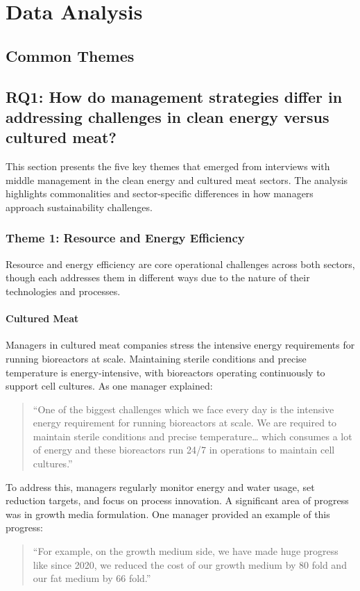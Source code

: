 
\section{Data Analysis}

\subsection*{Common Themes}

\subsection*{RQ1: How do management strategies differ in addressing challenges in clean energy versus cultured meat?}
This section presents the five key themes that emerged from interviews with middle management in the clean energy and cultured meat sectors. The analysis highlights commonalities and sector-specific differences in how managers approach sustainability challenges.

\subsubsection*{Theme 1: Resource and Energy Efficiency}
Resource and energy efficiency are core operational challenges across both sectors, though each addresses them in different ways due to the nature of their technologies and processes.

\paragraph{Cultured Meat}
Managers in cultured meat companies stress the intensive energy requirements for running bioreactors at scale. Maintaining sterile conditions and precise temperature is energy-intensive, with bioreactors operating continuously to support cell cultures. As one manager explained:
\begin{quote}
	“One of the biggest challenges which we face every day is the intensive energy requirement for running bioreactors at scale. We are required to maintain sterile conditions and precise temperature… which consumes a lot of energy and these bioreactors run 24/7 in operations to maintain cell cultures.”
\end{quote}
To address this, managers regularly monitor energy and water usage, set reduction targets, and focus on process innovation. A significant area of progress was in growth media formulation. One manager provided an example of this progress:
\begin{quote}
	“For example, on the growth medium side, we have made huge progress like since 2020, we reduced the cost of our growth medium by 80 fold and our fat medium by 66 fold.”
\end{quote}


